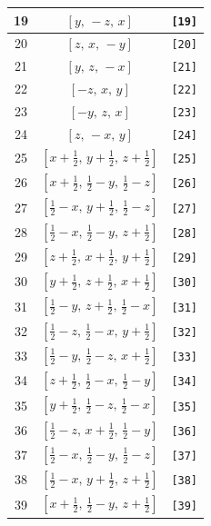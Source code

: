 \documentclass[fleqn,8pt]{jsarticle}
\begin{document}
\begin{longtable}{ccc}
19 & $\left[ y,\, - z,\, x \right]$ & {\tt [19]} \\ \hline
20 & $\left[ z,\, x,\, - y \right]$ & {\tt [20]} \\ \hline
21 & $\left[ y,\, z,\, - x \right]$ & {\tt [21]} \\ \hline
22 & $\left[ - z,\, x,\, y \right]$ & {\tt [22]} \\ \hline
23 & $\left[ - y,\, z,\, x \right]$ & {\tt [23]} \\ \hline
24 & $\left[ z,\, - x,\, y \right]$ & {\tt [24]} \\ \hline
25 & $\left[ x + \frac{1}{2},\, y + \frac{1}{2},\, z + \frac{1}{2} \right]$ & {\tt [25]} \\ \hline
26 & $\left[ x + \frac{1}{2},\, \frac{1}{2} - y,\, \frac{1}{2} - z \right]$ & {\tt [26]} \\ \hline
27 & $\left[ \frac{1}{2} - x,\, y + \frac{1}{2},\, \frac{1}{2} - z \right]$ & {\tt [27]} \\ \hline
28 & $\left[ \frac{1}{2} - x,\, \frac{1}{2} - y,\, z + \frac{1}{2} \right]$ & {\tt [28]} \\ \hline
29 & $\left[ z + \frac{1}{2},\, x + \frac{1}{2},\, y + \frac{1}{2} \right]$ & {\tt [29]} \\ \hline
30 & $\left[ y + \frac{1}{2},\, z + \frac{1}{2},\, x + \frac{1}{2} \right]$ & {\tt [30]} \\ \hline
31 & $\left[ \frac{1}{2} - y,\, z + \frac{1}{2},\, \frac{1}{2} - x \right]$ & {\tt [31]} \\ \hline
32 & $\left[ \frac{1}{2} - z,\, \frac{1}{2} - x,\, y + \frac{1}{2} \right]$ & {\tt [32]} \\ \hline
33 & $\left[ \frac{1}{2} - y,\, \frac{1}{2} - z,\, x + \frac{1}{2} \right]$ & {\tt [33]} \\ \hline
34 & $\left[ z + \frac{1}{2},\, \frac{1}{2} - x,\, \frac{1}{2} - y \right]$ & {\tt [34]} \\ \hline
35 & $\left[ y + \frac{1}{2},\, \frac{1}{2} - z,\, \frac{1}{2} - x \right]$ & {\tt [35]} \\ \hline
36 & $\left[ \frac{1}{2} - z,\, x + \frac{1}{2},\, \frac{1}{2} - y \right]$ & {\tt [36]} \\ \hline
37 & $\left[ \frac{1}{2} - x,\, \frac{1}{2} - y,\, \frac{1}{2} - z \right]$ & {\tt [37]} \\ \hline
38 & $\left[ \frac{1}{2} - x,\, y + \frac{1}{2},\, z + \frac{1}{2} \right]$ & {\tt [38]} \\ \hline
39 & $\left[ x + \frac{1}{2},\, \frac{1}{2} - y,\, z + \frac{1}{2} \right]$ & {\tt [39]} \\ \hline

\end{longtable}
\end{document}
